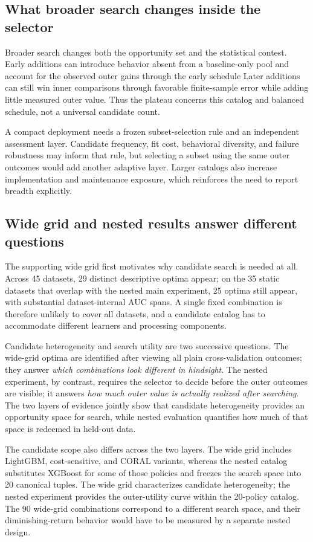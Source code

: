 \documentclass[referee]{USG}
\begin{document}
\subsection{What broader search changes inside the selector}
Broader search changes both the opportunity set and the statistical contest. Early additions can introduce behavior absent from a baseline-only pool and account for the observed outer gains through the early schedule Later additions can still win inner comparisons through favorable finite-sample error while adding little measured outer value. Thus the plateau concerns this catalog and balanced schedule, not a universal candidate count.

A compact deployment needs a frozen subset-selection rule and an independent assessment layer. Candidate frequency, fit cost, behavioral diversity, and failure robustness may inform that rule, but selecting a subset using the same outer outcomes would add another adaptive layer. Larger catalogs also increase implementation and maintenance exposure, which reinforces the need to report breadth explicitly.

\subsection{Wide grid and nested results answer different questions}
The supporting wide grid first motivates why candidate search is needed at all. Across 45 datasets, 29 distinct descriptive optima appear; on the 35 static datasets that overlap with the nested main experiment, 25 optima still appear, with substantial dataset-internal AUC spans. A single fixed combination is therefore unlikely to cover all datasets, and a candidate catalog has to accommodate different learners and processing components.

Candidate heterogeneity and search utility are two successive questions. The wide-grid optima are identified after viewing all plain cross-validation outcomes; they answer \emph{which combinations look different in hindsight}. The nested experiment, by contrast, requires the selector to decide before the outer outcomes are visible; it answers \emph{how much outer value is actually realized after searching}. The two layers of evidence jointly show that candidate heterogeneity provides an opportunity space for search, while nested evaluation quantifies how much of that space is redeemed in held-out data.

The candidate scope also differs across the two layers. The wide grid includes LightGBM, cost-sensitive, and CORAL variants, whereas the nested catalog substitutes XGBoost for some of those policies and freezes the search space into 20 canonical tuples. The wide grid characterizes candidate heterogeneity; the nested experiment provides the outer-utility curve within the 20-policy catalog. The 90 wide-grid combinations correspond to a different search space, and their diminishing-return behavior would have to be measured by a separate nested design.
\end{document}
